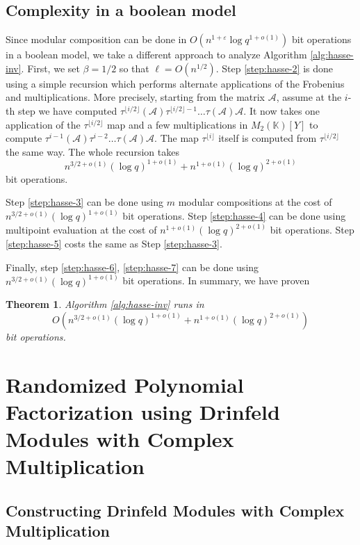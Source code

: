 \documentclass[12pt]{article}
\theoremstyle{plain}
\newtheorem{theorem}{Theorem}
\theoremstyle{definition}
\def\K{\ensuremath{\mathbb{K}}}
\begin{document}
\subsection{Complexity in a boolean model}

Since modular composition can be done in $O(n^{1 + \varepsilon}\log q^{1 + o(1)})$ bit operations 
in a boolean model, we take a different approach to analyze Algorithm \ref{alg:hasse-inv}. First,  
we set $\beta = 1/2$ so that $\ell = O(n^{1/2})$. Step \ref{step:hasse-2} is done using a simple 
recursion which performs alternate applications of the Frobenius and multiplications. More 
precisely, starting from the matrix $\mathcal{A}$, assume at the $i$-th step we have computed 
$\tau^{\lfloor i/2 \rfloor}(\mathcal{A}) \tau^{\lfloor i/2 \rfloor-1} \ldots \tau(\mathcal{A}) 
\mathcal{A}$. It now takes one application of the $\tau^{\lfloor i/2 \rfloor}$ map and a few 
multiplications in $M_2(\K)[Y]$ to compute $\tau^{i-1}(\mathcal{A}) \tau^{i-2} \ldots 
\tau(\mathcal{A}) \mathcal{A}$. The map $\tau^{\lfloor i \rfloor}$ itself is computed from
$\tau^{\lfloor i/2 \rfloor}$ the same way. The whole recursion takes
\[ n^{3/2+o(1)} (\log q)^{1+o(1)} + n^{1+o(1)} (\log q)^{2+o(1)} \]
bit operations. 

Step \ref{step:hasse-3} can be done using $m$ modular compositions at the cost of $n^{3/2+o(1)} 
(\log q)^{1+o(1)}$ bit operations. Step \ref{step:hasse-4} can be done using multipoint evaluation 
\cite{vzGG} at the cost of $n^{1+o(1)} (\log q)^{2+o(1)}$ bit operations. Step \ref{step:hasse-5} 
costs the same as Step \ref{step:hasse-3}. 

Finally, step \ref{step:hasse-6}, \ref{step:hasse-7} can be done using $n^{3/2+o(1)} (\log 
q)^{1+o(1)}$ bit operations. In summary, we have proven 
\begin{theorem}
	\label{theo:hasse-inv}
	Algorithm \ref{alg:hasse-inv} runs in 
	\[O(n^{3/2+o(1)} (\log q)^{1+o(1)} + n^{1+o(1)} (\log q)^{2+o(1)})\]
	bit operations.
\end{theorem}



 
 

\section{Randomized Polynomial Factorization using Drinfeld Modules with Complex Multiplication}
\subsection{Constructing Drinfeld Modules with Complex 
Multiplication}\label{drinfeld_construction_subsection}
\end{document}
